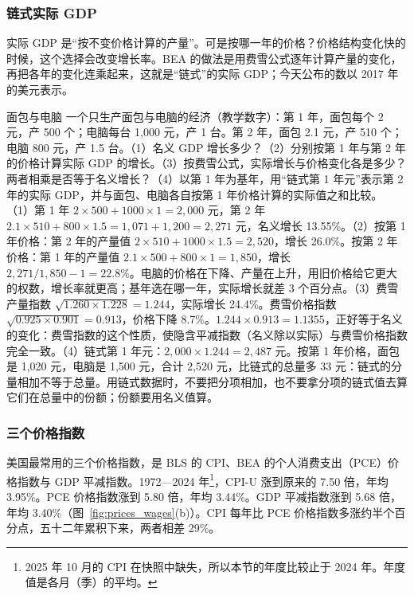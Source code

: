 \subsubsection{链式实际 GDP}
实际 GDP 是“按不变价格计算的产量”。可是按哪一年的价格？价格结构变化快的时候，这个选择会改变增长率。BEA 的做法是用费雪公式逐年计算产量的变化，再把各年的变化连乘起来，这就是“链式”的实际 GDP；今天公布的数以 2017 年的美元表示。

\begin{example}{面包与电脑}\label{ex:prices-chain}
一个只生产面包与电脑的经济（教学数字）：第 1 年，面包每个 2 元，产 500 个；电脑每台 1,000 元，产 1 台。第 2 年，面包 2.1 元，产 510 个；电脑 800 元，产 1.5 台。（1）名义 GDP 增长多少？（2）分别按第 1 年与第 2 年的价格计算实际 GDP 的增长。（3）按费雪公式，实际增长与价格变化各是多少？两者相乘是否等于名义增长？（4）以第 1 年为基年，用“链式第 1 年元”表示第 2 年的实际 GDP，并与面包、电脑各自按第 1 年价格计算的实际值之和比较。
\solution （1）第 1 年 $2\times500+1000\times1=2{,}000$ 元，第 2 年 $2.1\times510+800\times1.5=1{,}071+1{,}200=2{,}271$ 元，名义增长 13.55\%。（2）按第 1 年价格：第 2 年的产量值 $2\times510+1000\times1.5=2{,}520$，增长 26.0\%。按第 2 年价格：第 1 年的产量值 $2.1\times500+800\times1=1{,}850$，增长 $2{,}271/1{,}850-1=22.8\%$。电脑的价格在下降、产量在上升，用旧价格给它更大的权数，增长率就更高；基年选在哪一年，实际增长就差 3 个百分点。（3）费雪产量指数 $\sqrt{1.260\times1.228}=1.244$，实际增长 24.4\%。费雪价格指数 $\sqrt{0.925\times0.901}=0.913$，价格下降 8.7\%。$1.244\times0.913=1.1355$，正好等于名义的变化：费雪指数的这个性质，使隐含平减指数（名义除以实际）与费雪价格指数完全一致。（4）链式第 1 年元：$2{,}000\times1.244=2{,}487$ 元。按第 1 年价格，面包是 1,020 元，电脑是 1,500 元，合计 2,520 元，比链式的总量多 33 元：链式的分量相加不等于总量。用链式数据时，不要把分项相加，也不要拿分项的链式值去算它们在总量中的份额；份额要用名义值算。
\end{example}

\subsubsection{三个价格指数}
美国最常用的三个价格指数，是 BLS 的 CPI、BEA 的个人消费支出（PCE）价格指数与 GDP 平减指数。1972—2024 年\footnote{2025 年 10 月的 CPI 在快照中缺失，所以本节的年度比较止于 2024 年。年度值是各月（季）的平均。}，CPI-U 涨到原来的 7.50 倍，年均 3.95\%。PCE 价格指数涨到 5.80 倍，年均 3.44\%。GDP 平减指数涨到 5.68 倍，年均 3.40\%（图~\ref{fig:prices_wages}(b)）\cite{fred2026}。CPI 每年比 PCE 价格指数多涨约半个百分点，五十二年累积下来，两者相差 29\%。

